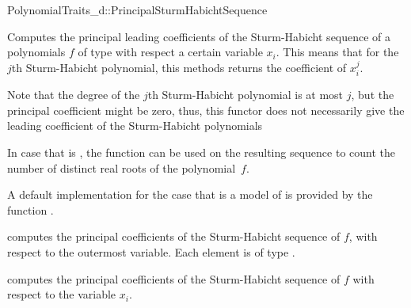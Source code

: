 \begin{ccRefConcept}{PolynomialTraits_d::PrincipalSturmHabichtSequence}
\ccDefinition

Computes the principal leading coefficients of the Sturm-Habicht sequence 
of a polynomials $f$ of type  
with respect a certain variable $x_i$.
This means that for the $j$th Sturm-Habicht polynomial, this methods returns
the coefficient of $x_i^j$. 

Note that the degree of the $j$th Sturm-Habicht polynomial is at most $j$,
but the principal coefficient might be zero, thus, this functor does not
necessarily give the leading coefficient of the Sturm-Habicht polynomials

In case that  is , the function  can be used
on the resulting sequence to count the number of distinct real roots of
the polynomial~$f$.

A default implementation for the case that 
is a model of 
is provided by the function .

\ccOperations
{}
         { computes the principal coefficients of the 
           Sturm-Habicht sequence of $f$, 
           with respect to the outermost variable. Each element is of type
           .}

         { computes the principal coefficients 
           of the Sturm-Habicht sequence of $f$ 
           with respect to the variable $x_i$.}


\ccSeeAlso

\\
\\
\\
\\

\end{ccRefConcept}
